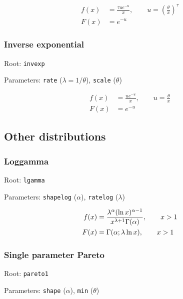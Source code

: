 \documentclass[x11names]{article}
\newcommand{\code}[1]{\texttt{#1}}
\begin{document}
\begin{align*}
  f(x) &= \frac{\tau u e^{-u}}{x},
  \qquad u = \left( \frac{\theta}{x} \right)^\tau \\
  F(x) &= e^{-u}
\end{align*}

\subsubsection*{Inverse exponential}

\begin{compactitem}[]
\item Root: \code{invexp}
\item Parameters: \code{rate}   ($\lambda = 1/\theta$),
      \code{scale}  ($\theta$)
\end{compactitem}

\begin{align*}
  f(x) &= \frac{u e^{-u}}{x},
  \qquad u = \frac{\theta}{x} \\
  F(x) &= e^{-u}
\end{align*}

\subsection{Other distributions}
\label{sec:appendix:other}

\subsubsection*{Loggamma}

\begin{compactitem}[]
\item Root: \code{lgamma}
\item Parameters: \code{shapelog} ($\alpha$),
      \code{ratelog}   ($\lambda$)
\end{compactitem}

\begin{align*}
  f(x) &= \frac{\lambda^\alpha (\ln x)^{\alpha - 1}}{%
    x^{\lambda + 1} \Gamma(\alpha)},
  \qquad x > 1 \\
  F(x) &= \Gamma( \alpha ; \lambda \ln x), \qquad x > 1
\end{align*}

\subsubsection*{Single parameter Pareto}

\begin{compactitem}[]
\item Root: \code{pareto1}
\item Parameters: \code{shape} ($\alpha$),
      \code{min}   ($\theta$)
\end{compactitem}
\end{document}
